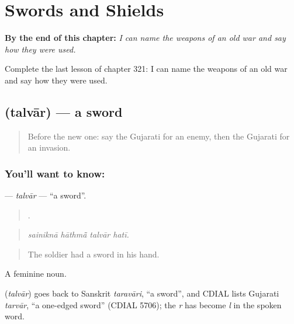 
\chapter{Swords and Shields}
\label{ch:gu-swords-and-shields}

\begin{chapteropening}
\textbf{By the end of this chapter:} \emph{I can name the weapons of an old war and say how they were used.}

Complete the last lesson of chapter 321: I can name the weapons of an old war and say how they were used.
\end{chapteropening}

\section[\texorpdfstring{\gu{તલવાર} (talvār)}{તલવાર (talvār)}]{ (talvār) — a sword}

\label{lesson:GU-C321-talvar}



\begin{quote}
Before the new one: say the Gujarati for an enemy, then the Gujarati for an invasion.
\end{quote}

\subsection*{You'll want to know: }
\textbf{} — \emph{talvār} — \textquotedblleft{}a sword\textquotedblright{}.

\begin{quote}
   .
\end{quote}

\begin{quote}
\emph{sainiknā hāthmā̃ talvār hatī.}
\end{quote}

\begin{quote}
The soldier had a sword in his hand.
\end{quote}

A feminine noun.

\begin{cousinweb}
\textbf{} (\emph{talvār}) goes back to Sanskrit \emph{taravāri}, \textquotedblleft{}a sword\textquotedblright{}, and CDIAL lists Gujarati \emph{tarvār}, \textquotedblleft{}a one-edged sword\textquotedblright{} (CDIAL 5706); the \emph{r} has become \emph{l} in the spoken word.
\end{cousinweb}

